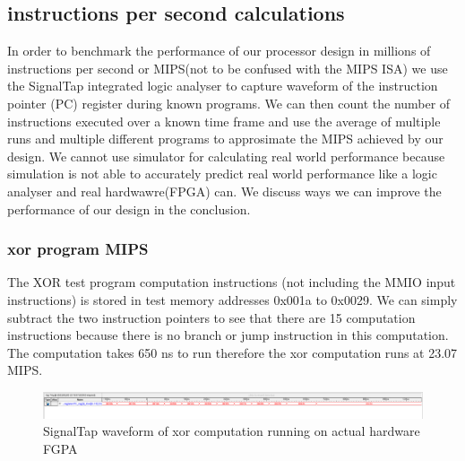\documentclass[a4paper,12pt]{report}
\begin{document}
\subsection{instructions per second calculations}
In order to benchmark the performance of our processor design in millions of instructions per second or MIPS(not to be confused with the MIPS ISA) we use the SignalTap integrated logic analyser to capture waveform of the instruction pointer (PC) register during known programs. We can then count the number of instructions executed over a known time frame and use the average of multiple runs and multiple different programs to approsimate the MIPS achieved by our design. We cannot use simulator for calculating real world performance because simulation is not able to accurately predict real world performance like a logic analyser and real hardwawre(FPGA) can. We discuss ways we can improve the performance of our design in the conclusion. 
\subsubsection{xor program MIPS}
The XOR test program computation instructions (not including the MMIO input instructions) is stored in test memory addresses 0x001a to 0x0029. We can simply subtract the two instruction pointers to see that there are 15 computation instructions because there is no branch or jump instruction in this computation. \newline
The computation takes 650 ns to run therefore the xor computation runs at 23.07 MIPS.
\begin{figure}[H]
    \begin{center}
        \includegraphics[scale=.3]{xor_computation}
        \caption{SignalTap waveform of xor computation running on actual hardware FGPA}   
    \end{center}
\end{figure}
\end{document}
